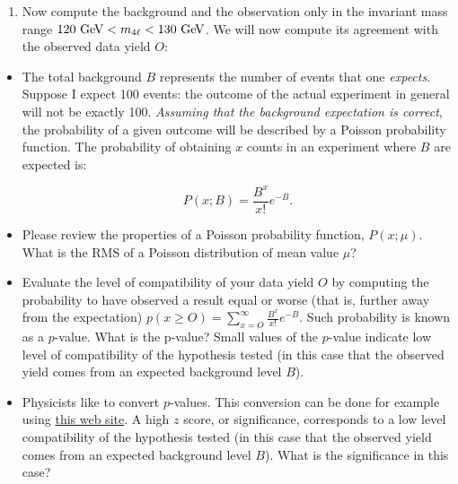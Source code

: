 \begin{enumerate}
\item Now compute the background and the observation only in the invariant mass range $120\ \text{Ge\kern -0.1em V} < m_{4\ell} < 130\ \text{Ge\kern -0.1em V}$. We will now compute its agreement with the observed data yield $O$: 
\end{enumerate}

\begin{exercise}
\begin{itemize} 
\item The total background $B$ represents the number of events that one \textit{expects}. Suppose I expect 100 events: the outcome of the actual experiment in general will not be exactly 100. \textit{Assuming that the background expectation is correct}, the probability of a given outcome will be described by a Poisson probability function. The probability of obtaining $x$ counts in an experiment where $B$ are expected is:

\begin{equation}
P(x;B) = \frac{B^{x}}{x!} e^{-B}.
\end{equation}
\item Please review the properties of a Poisson probability function, $P(x;\mu)$. What is the RMS of a Poisson distribution of mean value $\mu$?
\item Evaluate the level of compatibility of your data yield $O$ by computing the probability to have observed a result equal or worse (that is, further away from the expectation) $p(x \ge O) = \sum_{x = O}^{\infty} \frac{B^{x}}{x!} e^{-B}$. Such probability is known as a $p$-value. What is the p-value? Small values of the $p$-value indicate low level of compatibility of the hypothesis tested (in this case that the observed yield comes from an expected background level $B$). 
\item Physicists like to convert $p$-values. This conversion can be done for example using \href{https://planetcalc.com/7803/}{this web site}. A high $z$ score, or significance, corresponds to a low level  compatibility of the hypothesis tested (in this case that the observed yield comes from an expected background level $B$). What is the significance in this case?
\end{itemize}
\end{exercise}

